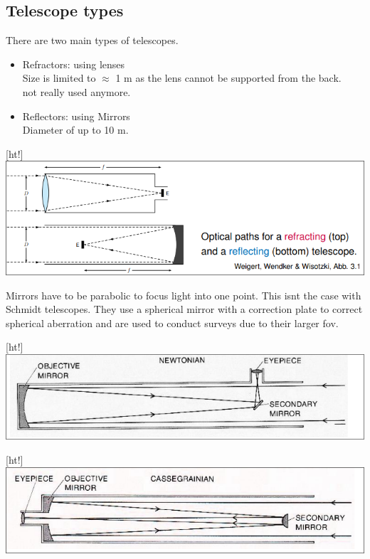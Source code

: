 \documentclass[11pt,a4paper]{article}
\begin{document}
\subsection{Telescope types}
There are two main types of telescopes. 
\begin{itemize}
    \item Refractors: using lenses \\ 
        Size is limited to $\approx$ 1 m as the lens cannot be supported from the back.\\ 
        not really used anymore.
    \item Reflectors: using Mirrors  \\ 
        Diameter of up to 10 m.
\end{itemize}
\begin{center}[ht!]
    \includegraphics[width=\linewidth]{screenshot_2024-01-13-191726.png}
\end{center}
Mirrors have to be parabolic to focus light into one point.
This isnt the case with Schmidt telescopes.
They use a spherical mirror with a correction plate to correct spherical aberration and are used to conduct surveys due to their larger fov.
\begin{center}[ht!]
    \includegraphics[width=\linewidth]{screenshot_2024-01-13-192049.png}
\end{center}
\begin{center}[ht!]
    \includegraphics[width=\linewidth]{screenshot_2024-01-13-192236.png}
\end{center}
\end{document}
